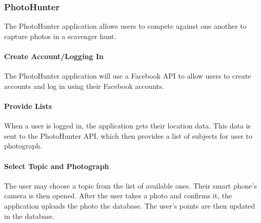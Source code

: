 \documentclass{article}
\begin{document}
\subsubsection{PhotoHunter}
The PhotoHunter application allows users to compete against one another to
capture photos in a scavenger hunt.

\paragraph{Create Account/Logging In}
The PhotoHunter application will use a Facebook API to allow users to create
accounts and log in using their Facebook accounts.

\paragraph{Provide Lists}
When a user is logged in, the application gets their location data. This data
is sent to the PhotoHunter API, which then provides a list of subjects for user
to photograph.

\paragraph{Select Topic and Photograph}
The user may choose a topic from the list of available ones. Their smart
phone's camera is then opened. After the user takes a photo and confirms it,
the application uploads the photo the database. The user's points are then
updated in the database.
\end{document}
